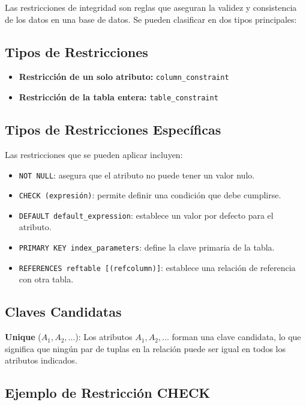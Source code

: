 \documentclass{article}
\begin{document}
Las restricciones de integridad son reglas que aseguran la validez y consistencia de los datos en una base de datos. Se pueden clasificar en dos tipos principales:

\subsection{Tipos de Restricciones}

\begin{itemize}
    \item \textbf{Restricción de un solo atributo:} \texttt{column\_constraint}
    \item \textbf{Restricción de la tabla entera:} \texttt{table\_constraint}
\end{itemize}

\subsection{Tipos de Restricciones Específicas}

Las restricciones que se pueden aplicar incluyen:

\begin{itemize}
    \item \texttt{NOT NULL}: asegura que el atributo no puede tener un valor nulo.
    \item \texttt{CHECK (expresión)}: permite definir una condición que debe cumplirse.
    \item \texttt{DEFAULT default\_expression}: establece un valor por defecto para el atributo.
    \item \texttt{PRIMARY KEY index\_parameters}: define la clave primaria de la tabla.
    \item \texttt{REFERENCES reftable [(refcolumn)]}: establece una relación de referencia con otra tabla.
\end{itemize}

\subsection{Claves Candidatas}

\textbf{Unique} ($A_1, A_2, ...$): Los atributos $A_1, A_2, ...$ forman una clave candidata, lo que significa que ningún par de tuplas en la relación puede ser igual en todos los atributos indicados.

\subsection{Ejemplo de Restricción CHECK}
\end{document}
